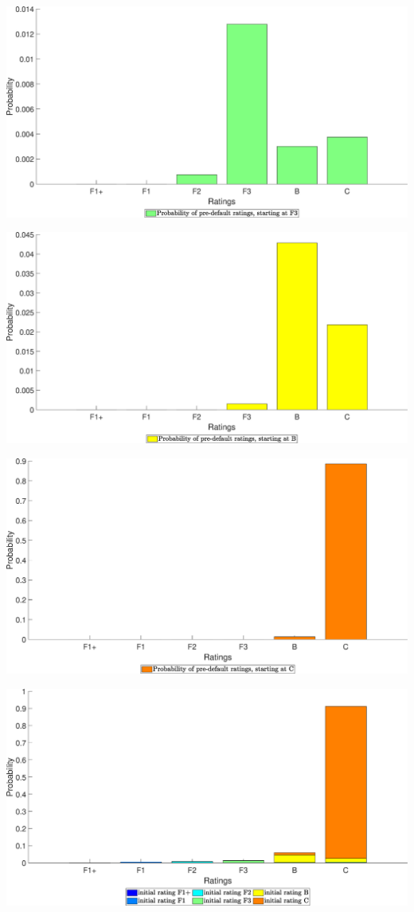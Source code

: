 \begin{landscape}
\includegraphics[width=.95\columnwidth]{PrePDP/PrePDP_FOBB_4}
\end{landscape}
\begin{landscape}
\includegraphics[width=.95\columnwidth]{PrePDP/PrePDP_FOBB_5}
\end{landscape}
\begin{landscape}
\includegraphics[width=.95\columnwidth]{PrePDP/PrePDP_FOBB_6}
\end{landscape}
\begin{landscape}
\includegraphics[width=.95\columnwidth]{PrePDP/PrePDP_FOBB_7}
\end{landscape}
